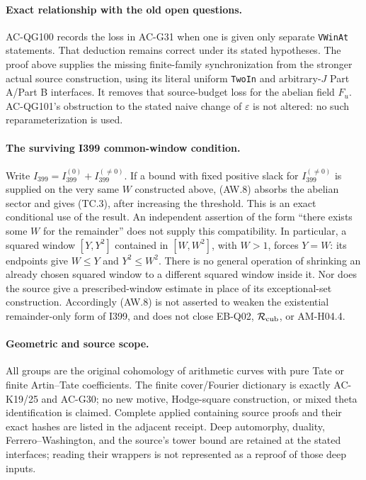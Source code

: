 \paragraph{Exact relationship with the old open questions.}
AC-QG100 records the loss in AC-G31 when one is given only
separate \texttt{VWinAt} statements.  That deduction remains
correct under its stated hypotheses.  The proof above supplies
the missing finite-family synchronization from the stronger
actual source construction, using its literal uniform
\texttt{TwoIn} and arbitrary-$J$ Part A/Part B interfaces.
It removes that source-budget loss for the abelian field $F_u$.
AC-QG101's obstruction to the stated naive change of
$\varepsilon$ is not altered: no such reparameterization is used.

\paragraph{The surviving I399 common-window condition.}
Write $I_{399}=I_{399}^{(0)}+I_{399}^{(\ne0)}$.
If a bound with fixed positive slack for $I_{399}^{(\ne0)}$
is supplied on the very same $W$ constructed above, (AW.8)
absorbs the abelian sector and gives (TC.3), after increasing
the threshold.  This is an exact conditional use of the result.
An independent assertion of the form ``there exists some
$W$ for the remainder'' does not supply this compatibility.
In particular, a squared window $[Y,Y^2]$ contained in
$[W,W^2]$, with $W>1$, forces $Y=W$: its endpoints give
$W\leq Y$ and $Y^2\leq W^2$.
There is no general operation of shrinking an already chosen
squared window to a different squared window inside it.
Nor does the source give a prescribed-window estimate in place
of its exceptional-set construction.
Accordingly (AW.8) is not asserted to weaken the existential
remainder-only form of I399, and does not close EB-Q02,
$\mathcal R_{\rm cub}$, or AM-H04.4.

\paragraph{Geometric and source scope.}
All groups are the original cohomology of arithmetic curves
with pure Tate or finite Artin--Tate coefficients.
The finite cover/Fourier dictionary is exactly AC-K19/25 and
AC-G30; no new motive, Hodge-square construction, or mixed
theta identification is claimed.  Complete applied containing
source proofs and their exact hashes are listed in the adjacent
receipt.  Deep automorphy, duality, Ferrero--Washington, and
the source's tower bound are retained at the stated interfaces;
reading their wrappers is not represented as a reproof of those
deep inputs.
